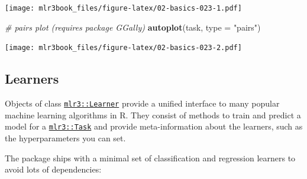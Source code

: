\documentclass[]{article}
\newenvironment{Shaded}{\begin{snugshade}}{\end{snugshade}}
\newcommand{\CommentTok}[1]{\textcolor[rgb]{0.56,0.35,0.01}{\textit{#1}}}
\newcommand{\DataTypeTok}[1]{\textcolor[rgb]{0.13,0.29,0.53}{#1}}
\newcommand{\DecValTok}[1]{\textcolor[rgb]{0.00,0.00,0.81}{#1}}
\newcommand{\KeywordTok}[1]{\textcolor[rgb]{0.13,0.29,0.53}{\textbf{#1}}}
\newcommand{\NormalTok}[1]{#1}
\newcommand{\OperatorTok}[1]{\textcolor[rgb]{0.81,0.36,0.00}{\textbf{#1}}}
\newcommand{\StringTok}[1]{\textcolor[rgb]{0.31,0.60,0.02}{#1}}
\renewenvironment{Shaded} {\begin{snugshade}\small} {\end{snugshade}}
\begin{document}
\begin{Shaded}
\end{Shaded}

\texttt{[image: mlr3book\_files/figure-latex/02-basics-023-1.pdf]}

\begin{Shaded}
\begin{Highlighting}[]
\CommentTok{# pairs plot (requires package GGally)}
\KeywordTok{autoplot}\NormalTok{(task, }\DataTypeTok{type =} \StringTok{"pairs"}\NormalTok{)}
\end{Highlighting}
\end{Shaded}

\texttt{[image: mlr3book\_files/figure-latex/02-basics-023-2.pdf]}

\hypertarget{learners}{%
\subsection{Learners}\label{learners}}

Objects of class \href{https://mlr3.mlr-org.com/reference/Learner.html}{\texttt{mlr3::Learner}} provide a unified interface to many popular machine learning algorithms in R.
They consist of methods to train and predict a model for a \href{https://mlr3.mlr-org.com/reference/Task.html}{\texttt{mlr3::Task}} and provide meta-information about the learners, such as the hyperparameters you can set.

The package ships with a minimal set of classification and regression learners to avoid lots of dependencies:
\end{document}
